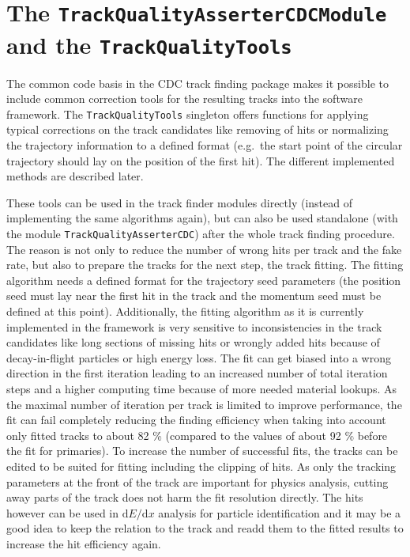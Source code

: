 \section{The \texttt{Track\-Quality\-Asserter\-CDC\-Module} and the \texttt{Track\-Quality\-Tools}}  \label{section-quality}

The common code basis in the CDC track finding package makes it possible to include common correction tools for the resulting tracks into the software framework. The \texttt{Track\-Quality\-Tools} singleton offers functions for applying typical corrections on the track candidates like removing of hits or normalizing the trajectory information to a defined format (e.g.\ the start point of the circular trajectory should lay on the position of the first hit). The different implemented methods are described later.

These tools can be used in the track finder modules directly (instead of implementing the same algorithms again), but can also be used standalone (with the module \texttt{Track\-Quality\-Asserter\-CDC}) after the whole track finding procedure. The reason is not only to reduce the number of wrong hits per track and the fake rate, but also to prepare the tracks for the next step, the track fitting. The fitting algorithm needs a defined format for the trajectory seed parameters (the position seed must lay near the first hit in the track and the momentum seed must be defined at this point). Additionally, the fitting algorithm as it is currently implemented in the framework is very sensitive to inconsistencies in the track candidates like long sections of missing hits or wrongly added hits because of decay-in-flight particles or high energy loss. The fit can get biased into a wrong direction in the first iteration leading to an increased number of total iteration steps and a higher computing time because of more needed material lookups. As the maximal number of iteration per track is limited to improve performance, the fit can fail completely reducing the finding efficiency when taking into account only fitted tracks to about 82 \% (compared to the values of about 92 \% before the fit for primaries). To increase the number of successful fits, the tracks can be edited to be suited for fitting including the clipping of hits. As only the tracking parameters at the front of the track are important for physics analysis, cutting away parts of the track does not harm the fit resolution directly. The hits however can be used in $\mathrm d E/\mathrm d x$ analysis for particle identification and it may be a good idea to keep the relation to the track and readd them to the fitted results to increase the hit efficiency again. 

